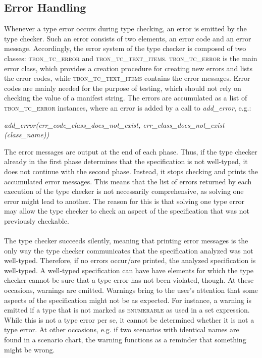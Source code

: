 \subsection{Error Handling}
\label{implementation-error-handling}
Whenever a type error occurs during type checking, an error is emitted by the type checker. Such an error consists of two elements, an error code and an error message. Accordingly, the error system of the type checker is composed of two classes: \textsc{tbon\_tc\_error} and \textsc{tbon\_tc\_text\_items}. \textsc{tbon\_tc\_error} is the main error class, which provides a creation procedure for creating new errors and lists the error codes, while \textsc{tbon\_tc\_text\_items} contains the error messages. Error codes are mainly needed for the purpose of testing, which should not rely on checking the value of a manifest string. The errors are accumulated as a list of  \textsc{tbon\_tc\_error} instances, where an error is added by a call to \textit{add\_error}, e.g.: 
{\footnotesize
\begin{center}
\textit{add\_error(err\_code\_class\_does\_not\_exist, err\_class\_does\_not\_exist (class\_name))}
\end{center}}
The error messages are output at the end of each phase. Thus, if the type checker already in the first phase determines that the specification is not well-typed, it does not continue with the second phase. Instead, it stops checking and prints the accumulated error messages. This means that the list of errors returned by each execution of the type checker is not necessarily comprehensive, as solving one error might lead to another. The reason for this is that solving one type error may allow the type checker to check an aspect of the specification that was not previously checkable.
\paragraph{}
The type checker succeeds silently, meaning that printing error messages is the only way the type checker communicates that the specification analyzed was not well-typed. Therefore, if no errors occur/are printed, the analyzed specification is well-typed. A well-typed specification can have have elements for which the type checker cannot be sure that a type error has not been violated, though. At these occasions, warnings are emitted. Warnings bring to the user's attention that some aspects of the specification might not be as expected. For instance, a warning is emitted if a type that is not marked as \textsc{enumerable} as used in a set expression. While this is not a type error per se, it cannot be determined whether it is not a type error. At other occasions, e.g. if two scenarios with identical names are found in a scenario chart, the warning functions as a reminder that something might be wrong.

